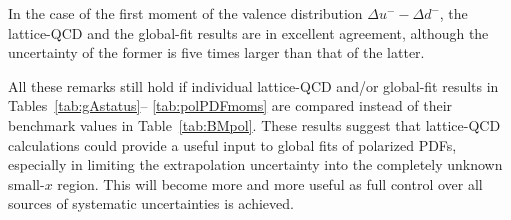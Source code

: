 In the case of the first moment of the valence distribution 
$\Delta u^--\Delta d^-$, the lattice-QCD and the global-fit results are 
in excellent agreement, although the uncertainty of the former is five times
larger than that of the latter.

All these remarks still hold if individual lattice-QCD and/or global-fit
results in Tables~\ref{tab:gAstatus}--%
\ref{tab:polPDFmoms}
are compared instead of their benchmark values in Table~\ref{tab:BMpol}.
%
These results suggest that lattice-QCD calculations could provide a useful
input to global fits of polarized PDFs, especially in limiting the
extrapolation uncertainty into the completely unknown small-$x$ region.
%
This will become more and more useful as full control over all sources of
systematic uncertainties is achieved.
